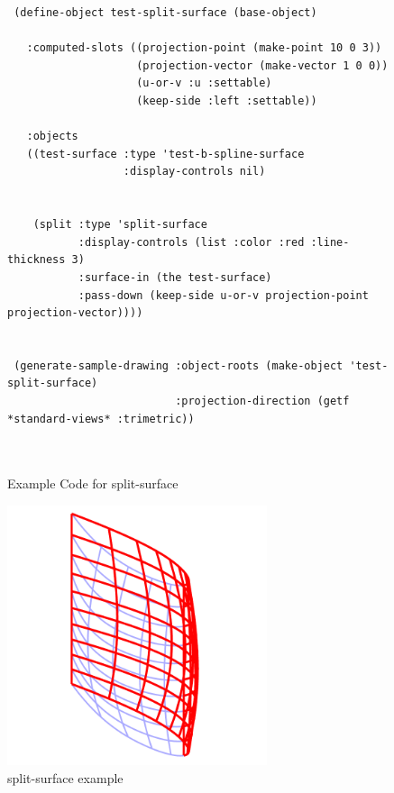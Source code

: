 \documentclass [11pt]{book}
\begin{document}
\begin{itemize}
\begin{figure}
\begin{lrbox}{\boxedverb}
\begin{minipage}{\linewidth}
{\begin{verbatim}
 (define-object test-split-surface (base-object)
  
   :computed-slots ((projection-point (make-point 10 0 3))
                    (projection-vector (make-vector 1 0 0))
                    (u-or-v :u :settable)
                    (keep-side :left :settable))
  
   :objects
   ((test-surface :type 'test-b-spline-surface
                  :display-controls nil)

   
    (split :type 'split-surface
           :display-controls (list :color :red :line-thickness 3)
           :surface-in (the test-surface)
           :pass-down (keep-side u-or-v projection-point projection-vector))))


 (generate-sample-drawing :object-roots (make-object 'test-split-surface)
                          :projection-direction (getf *standard-views* :trimetric))



\end{verbatim}}
\end{minipage}
\end{lrbox}
\fbox{\usebox{\boxedverb}}

\caption{Example Code for split-surface}

\label{fig:example-code-split-surface}

\end{figure}

\begin{figure}
\begin{center}
\includegraphics[width=3in,height=3in]{../images/example-split-surface.pdf}
\end{center}

\caption{split-surface example}

\label{fig:split-surface}


\end{figure}
\end{itemize}
\end{document}
